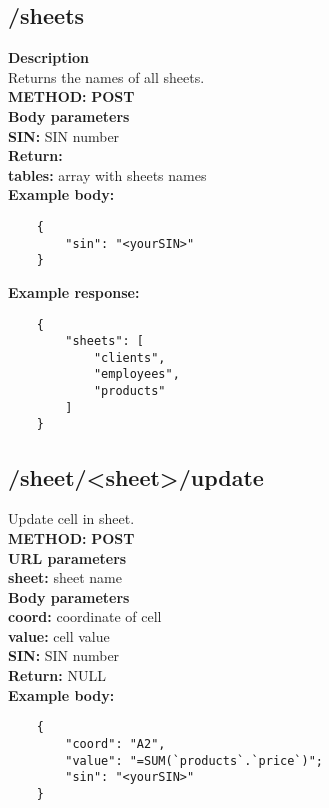 \documentclass[a4paper, 12pt]{report}
\begin{document}
\subsection{/sheets}
\textbf{\color{redText} Description} \\
Returns the names of all sheets. \\
\textbf{\color{redText} METHOD: } \textbf{POST} \\
\textbf{\color{redText} Body parameters} \\
\textbf{SIN: } SIN number\\
\textbf{\color{redText} Return: } \\
\textbf{tables: } array with sheets names \\
\textbf{\color{redText} Example body: }
\begin{lstlisting}
    {
        "sin": "<yourSIN>"
    }
\end{lstlisting}
\textbf{\color{redText} Example response: }
\begin{lstlisting}
    {
        "sheets": [
            "clients",
            "employees",
            "products"
        ]
    }
\end{lstlisting}

\subsection{/sheet/<sheet>/update}
Update cell in sheet.\\
\textbf{\color{redText} METHOD: } \textbf{POST} \\
\textbf{\color{redText} URL parameters} \\
\textbf{sheet: } sheet name\\
\textbf{\color{redText} Body parameters} \\
\textbf{coord: } coordinate of cell\\
\textbf{value: } cell value\\
\textbf{SIN: } SIN number\\
\textbf{\color{redText} Return: } NULL\\
\textbf{\color{redText} Example body: }
\begin{lstlisting}
    {
        "coord": "A2",
        "value": "=SUM(`products`.`price`)";
        "sin": "<yourSIN>"
    }
\end{lstlisting}
\end{document}
